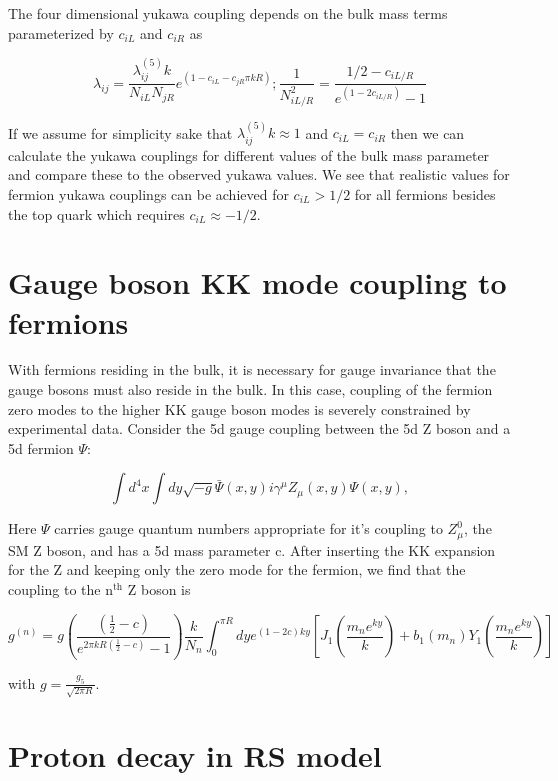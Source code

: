 \documentclass[aps,onecolumn,twoside,secnumarabic,balancelastpage,amsmath,amssymb,nofootinbib,hyperref=pdftex]{revtex4}
\begin{document}
The four dimensional yukawa coupling depends on the bulk mass terms parameterized by $c_{iL}$ and $c_{iR}$ as

\begin{equation}
\lambda_{ij} = \frac{\lambda^{(5)}_{ij}k}{N_{iL}N_{jR}}e^{(1 - c_{iL} - c_{jR}\pi kR)}; \frac{1}{N^{2}_{iL/R}} = \frac{1/2 - c_{iL/R}}{e^{(1-2c_{iL/R})} - 1}
\end{equation}

If we assume for simplicity sake that $\lambda^{(5)}_{ij}k \approx 1$ and $c_{iL} = c_{iR}$ then we can calculate the yukawa couplings for different values of the bulk mass parameter and compare these to the observed yukawa values. We see that realistic values for fermion yukawa couplings can be achieved for $c_{iL} > 1/2$ for all fermions besides the top quark which requires $c_{iL} \approx -1/2$.

\section{Gauge boson KK mode coupling to fermions}

With fermions residing in the bulk, it is necessary for gauge invariance that the gauge bosons must also reside in the bulk. In this case, coupling of the fermion zero modes to the higher KK gauge boson modes is severely constrained by experimental data. Consider the 5d gauge coupling between the 5d Z boson and a 5d fermion $\Psi$:

\begin{equation}
\int d^{4}x\int dy \sqrt{-g}\bar{\Psi}(x,y)i\gamma^{\mu}Z_{\mu}(x,y)\Psi(x,y),
\end{equation}

Here $\Psi$ carries gauge quantum numbers appropriate for it's coupling to $Z^{0}_{\mu}$, the SM Z boson, and has a 5d mass parameter c. After inserting the KK expansion for the Z and keeping only the zero mode for the fermion, we find that the coupling to the $\text{n}^{\text{th}}$ Z boson is

\begin{equation}
g^{(n)} = g\left(\frac{(\frac{1}{2} - c)}{e^{2\pi kR(\frac{1}{2} - c)} - 1}\right) \frac{k}{N_{n}}\int_{0}^{\pi R}dy e^{(1-2c)ky}[J_{1}(\frac{m_{n}e^{ky}}{k}) + b_{1}(m_{n})Y_{1}(\frac{m_{n}e^{ky}}{k})]
\end{equation}

with $g = \frac{g_{5}}{\sqrt{2\pi R}}$.

\section{Proton decay in RS model}
\end{document}
